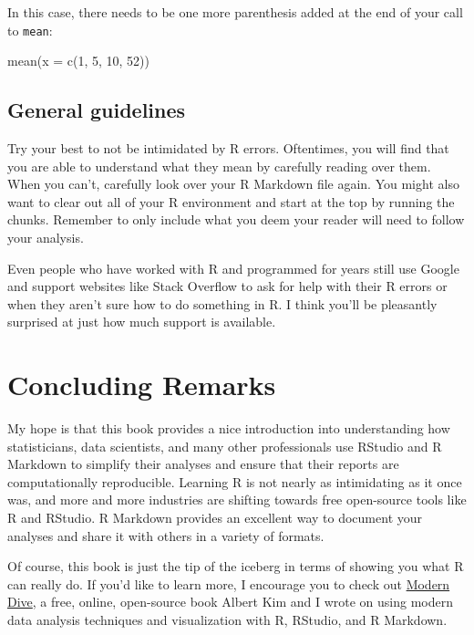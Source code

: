 \documentclass[]{tufte-book}
\newenvironment{Shaded}{\begin{snugshade}}{\end{snugshade}}
\newcommand{\AttributeTok}[1]{\textcolor[rgb]{0.77,0.63,0.00}{#1}}
\newcommand{\DecValTok}[1]{\textcolor[rgb]{0.00,0.00,0.81}{#1}}
\newcommand{\FunctionTok}[1]{\textcolor[rgb]{0.00,0.00,0.00}{#1}}
\newcommand{\NormalTok}[1]{#1}
\begin{document}
In this case, there needs to be one more parenthesis added at the end of your call to \texttt{mean}:

\begin{Shaded}
\begin{Highlighting}[]
\FunctionTok{mean}\NormalTok{(}\AttributeTok{x =} \FunctionTok{c}\NormalTok{(}\DecValTok{1}\NormalTok{, }\DecValTok{5}\NormalTok{, }\DecValTok{10}\NormalTok{, }\DecValTok{52}\NormalTok{))}
\end{Highlighting}
\end{Shaded}

\hypertarget{general-guidelines}{%
\section{General guidelines}\label{general-guidelines}}

Try your best to not be intimidated by R errors. Oftentimes, you will find that you are able to understand what they mean by carefully reading over them. When you can't, carefully look over your R Markdown file again. You might also want to clear out all of your R environment and start at the top by running the chunks. Remember to only include what you deem your reader will need to follow your analysis.

Even people who have worked with R and programmed for years still use Google and support websites like Stack Overflow to ask for help with their R errors or when they aren't sure how to do something in R. I think you'll be pleasantly surprised at just how much support is available.

\hypertarget{conclusion}{%
\chapter{Concluding Remarks}\label{conclusion}}

My hope is that this book provides a nice introduction into understanding how statisticians, data scientists, and many other professionals use RStudio and R Markdown to simplify their analyses and ensure that their reports are computationally reproducible. Learning R is not nearly as intimidating as it once was, and more and more industries are shifting towards free open-source tools like R and RStudio. R Markdown provides an excellent way to document your analyses and share it with others in a variety of formats.

Of course, this book is just the tip of the iceberg in terms of showing you what R can really do. If you'd like to learn more, I encourage you to check out \href{http://www.moderndive.com/}{Modern Dive}, a free, online, open-source book Albert Kim and I wrote on using modern data analysis techniques and visualization with R, RStudio, and R Markdown.
\end{document}
